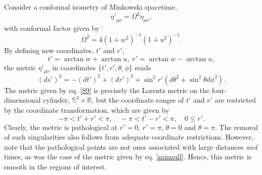 \documentclass[
12pt,		%
openright,	%
twoside,  %
a4paper,			%
chapter=TITLE,		%
english,			%
french,				%
spanish,			%
brazil				%
]{USPSC-classe/USPSC}
\begin{document}
Consider a conformal isometry of Minkowski spacetime,
\begin{equation}
    {\eta'}_{\mu\nu}=\Omega^2\eta_{\mu\nu},
\end{equation}
with conformal factor given by
\begin{equation}
    \Omega^2=4(1+w^2)^{-1}(1+u^2)^{-1}.
\end{equation}
By defining new coordinates, $t'$ and $r'$,
\begin{equation}
    t'=\arctan w+\arctan u,\; r'=\arctan w-\arctan u,
\end{equation}
the metric ${\eta'}_{\mu\nu}$ in coordinates $\{t',r',\theta,\phi\}$ reads
\begin{equation} \label{89}
    (ds')^2=-(dt')^2+(dr')^2+\sin^2 r'(d\theta^2+\sin^2\theta d\phi^2).
\end{equation}
The metric given by eq. \ref{89} is precisely the Lorentz metric on the four-dimensional cylinder, $\mathbb{S}^3\times\mathbb{R}$, but the coordinate ranges of $t'$ and $r'$ are restricted by the coordinate transformation, which are given by
\begin{equation}\label{eq25}
    -\pi < t'+r'< \pi,\quad-\pi < t'-r'< \pi,\quad0\leq r'.
\end{equation}
Clearly, the metric is pathological at $r'=0$, $r'=\pi$, $\theta=0$ and $\theta=\pi$. The removal of such singularities also follows from adequate coordinate restrictions. However, note that the pathological points are not ones associated with large distances \textit{and} times, as was the case of the metric given by eq. \ref{minnull}. Hence, this metric is smooth in the regions of interest.
\end{document}
